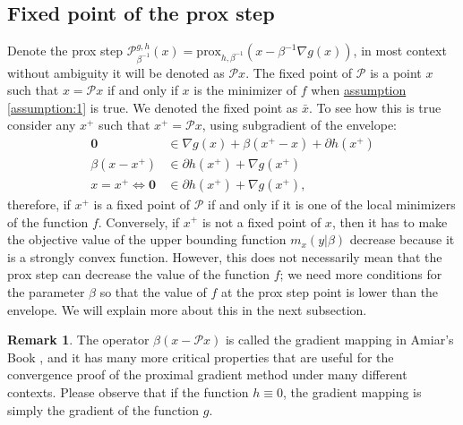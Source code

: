 \documentclass[]{article}
\theoremstyle{definition}
\newtheorem{remark}{Remark}[subsection]
{
    \newtheorem{assumption}{Assumption}
}
\begin{document}
    \subsection{Fixed point of the prox step}\label{sec:fixed_point_prox}
        Denote the prox step $\mathcal P_{\beta^{-1}}^{g, h}(x) = \text{prox}_{h, \beta^{-1}}(x - \beta^{-1}\nabla g(x))$, in most context without ambiguity it will be denoted as $\mathcal Px$. The fixed point of $\mathcal P$ is a point $x$ such that $x = \mathcal P x$ if and only if $x$ is the minimizer of $f$ when \hyperref[assumption:1]{assumption \ref*{assumption:1}} is true. We denoted the fixed point as $\bar x$. To see how this is true consider any $x^+$ such that $x^+ = \mathcal Px$, using subgradient of the envelope: 
        \begin{align*}
            \mathbf 0 
            &\in \nabla g(x) + \beta(x^+ - x) + \partial h(x^+)
            \\
            \beta(x - x^+) &\in \partial h(x^+) + \nabla g(x^+)
            \\
            x = x^+ \iff \mathbf 0 &\in 
            \partial h(x^+) + \nabla g(x^+), 
        \end{align*}
        therefore, if $x^+$ is a fixed point of $\mathcal P$ if and only if it is one of the local minimizers of the function $f$. Conversely, if $x^+$ is not a fixed point of $x$, then it has to make the objective value of the upper bounding function $m_x(y| \beta)$ decrease because it is a strongly convex function. However, this does not necessarily mean that the prox step can decrease the value of the function $f$; we need more conditions for the parameter $\beta$ so that the value of $f$ at the prox step point is lower than the envelope. We will explain more about this in the next subsection. 
        \begin{remark}
            The operator $\beta(x - \mathcal Px)$ is called the gradient mapping in Amiar's Book \cite{book:first_order_opt}, and it has many more critical properties that are useful for the convergence proof of the proximal gradient method under many different contexts. Please observe that if the function $h \equiv 0$, the gradient mapping is simply the gradient of the function $g$. 
        \end{remark}
\end{document}
